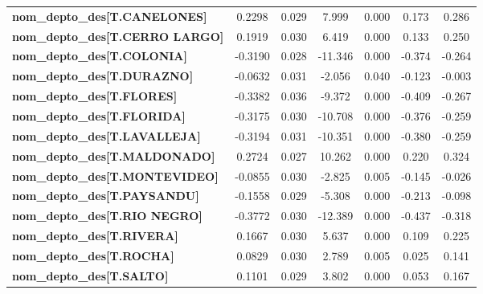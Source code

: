 \begin{center}
\begin{tabular}{lcccccc}
\textbf{nom\_depto\_des[T.CANELONES]}       &       0.2298  &        0.029     &     7.999  &         0.000        &        0.173    &        0.286     \\
\textbf{nom\_depto\_des[T.CERRO LARGO]}     &       0.1919  &        0.030     &     6.419  &         0.000        &        0.133    &        0.250     \\
\textbf{nom\_depto\_des[T.COLONIA]}         &      -0.3190  &        0.028     &   -11.346  &         0.000        &       -0.374    &       -0.264     \\
\textbf{nom\_depto\_des[T.DURAZNO]}         &      -0.0632  &        0.031     &    -2.056  &         0.040        &       -0.123    &       -0.003     \\
\textbf{nom\_depto\_des[T.FLORES]}          &      -0.3382  &        0.036     &    -9.372  &         0.000        &       -0.409    &       -0.267     \\
\textbf{nom\_depto\_des[T.FLORIDA]}         &      -0.3175  &        0.030     &   -10.708  &         0.000        &       -0.376    &       -0.259     \\
\textbf{nom\_depto\_des[T.LAVALLEJA]}       &      -0.3194  &        0.031     &   -10.351  &         0.000        &       -0.380    &       -0.259     \\
\textbf{nom\_depto\_des[T.MALDONADO]}       &       0.2724  &        0.027     &    10.262  &         0.000        &        0.220    &        0.324     \\
\textbf{nom\_depto\_des[T.MONTEVIDEO]}      &      -0.0855  &        0.030     &    -2.825  &         0.005        &       -0.145    &       -0.026     \\
\textbf{nom\_depto\_des[T.PAYSANDU]}        &      -0.1558  &        0.029     &    -5.308  &         0.000        &       -0.213    &       -0.098     \\
\textbf{nom\_depto\_des[T.RIO NEGRO]}       &      -0.3772  &        0.030     &   -12.389  &         0.000        &       -0.437    &       -0.318     \\
\textbf{nom\_depto\_des[T.RIVERA]}          &       0.1667  &        0.030     &     5.637  &         0.000        &        0.109    &        0.225     \\
\textbf{nom\_depto\_des[T.ROCHA]}           &       0.0829  &        0.030     &     2.789  &         0.005        &        0.025    &        0.141     \\
\textbf{nom\_depto\_des[T.SALTO]}           &       0.1101  &        0.029     &     3.802  &         0.000        &        0.053    &        0.167     \\

\end{tabular}
\end{center}

